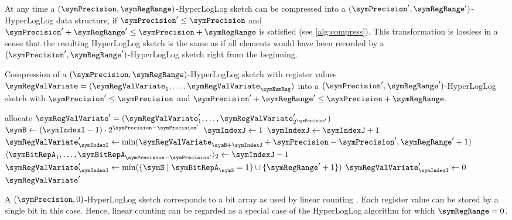 \documentclass[a4paper]{scrartcl}
\newcommand{\comm}[2]{{\Comment{\parbox[t]{#1\linewidth}{{#2}}}}}
\begin{document}
At any time a $(\symPrecision, \symRegRange)$-HyperLogLog sketch can be compressed into a $(\symPrecision', \symRegRange')$-HyperLogLog data structure, if $\symPrecision'\leq\symPrecision$ and $\symPrecision'+\symRegRange' \leq\symPrecision + \symRegRange$ is satisfied (see \cref{alg:compress}). This transformation is lossless in a sense that the resulting HyperLogLog sketch is the same as if all elements would have been recorded by a $(\symPrecision', \symRegRange')$-HyperLogLog sketch right from the beginning.

\begin{algorithm}
\caption{Compression of a $(\symPrecision, \symRegRange)$-HyperLogLog sketch with register values $\boldsymbol{\symRegValVariate}=(\symRegValVariate_1,\ldots,\symRegValVariate_\symNumReg)$ into a $(\symPrecision', \symRegRange')$-HyperLogLog sketch with $\symPrecision'\leq\symPrecision$ and $\symPrecision'+\symRegRange' \leq\symPrecision + \symRegRange$.}
\label{alg:compress}
\begin{algorithmic}
\comm{.4}{$\boldsymbol{\symRegValVariate}\in\lbrace 0,1,\ldots,\symRegRange+1\rbrace^\symNumReg$, $\symNumReg = 2^\symPrecision$}
\State allocate $\boldsymbol{\symRegValVariate}' = (\symRegValVariate'_1,\ldots,\symRegValVariate'_{2^{\symPrecision'}})$
\comm{.4}{$\boldsymbol{\symRegValVariate}'\in\lbrace 0,1,\ldots,\symRegRange'+1\rbrace^{\symNumReg'}$, $\symNumReg' = 2^{\symPrecision'}$}
\State $\symB \gets (\symIndexI-1)\cdot 2^{\symPrecision-\symPrecision'}$
\State $\symIndexJ\gets 1$
\State $\symIndexJ\gets\symIndexJ+1$
\EndWhile
{}
\State $\symRegValVariate'_\symIndexI \gets \min(\symRegValVariate_{\symB+\symIndexJ} + \symPrecision-\symPrecision',\symRegRange'+1)$
\State $\langle \symBitRepA_1, \ldots, \symBitRepA_{\symPrecision-\symPrecision'}\rangle_2 \gets \symIndexJ-1$
\State $\symRegValVariate'_\symIndexI \gets 
\min(\{\symS\mid \symBitRepA_\symS = 1\} \cup \{\symRegRange'+1\})$
\Else
\State $\symRegValVariate'_\symIndexI \gets 0$
\EndIf
\EndFor
\State \Return $\boldsymbol{\symRegValVariate}'$
\EndFunction
\end{algorithmic}
\end{algorithm}

A $(\symPrecision, 0)$-HyperLogLog sketch corresponds to a bit array as used by linear counting \cite{Whang1990}. Each register value can be stored by a single bit in this case. Hence, linear counting can be regarded as a special case of the HyperLogLog algorithm for which $\symRegRange = 0$.
\end{document}

